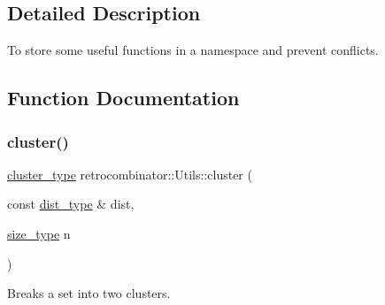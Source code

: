 \subsection{Detailed Description}
To store some useful functions in a namespace and prevent conflicts. 

\subsection{Function Documentation}
\mbox{\label{namespaceretrocombinator_1_1Utils_a03dcc302a7444a0c0897ea1b306e69ef}} 
\subsubsection{\texorpdfstring{cluster()}{cluster()}}
{\footnotesize\ttfamily \hyperlink{namespaceretrocombinator_a316667a6633d664fe892bd7e0eb0141e}{cluster\+\_\+type} retrocombinator\+::\+Utils\+::cluster (\begin{DoxyParamCaption}\item[{const \hyperlink{namespaceretrocombinator_aa416b6a3a9e444eae3309a16b8607750}{dist\+\_\+type} \&}]{dist,  }\item[{\hyperlink{namespaceretrocombinator_a8e1541b50cee66a791df4c437ccbb385}{size\+\_\+type}}]{n }\end{DoxyParamCaption})}



Breaks a set into two clusters. 



